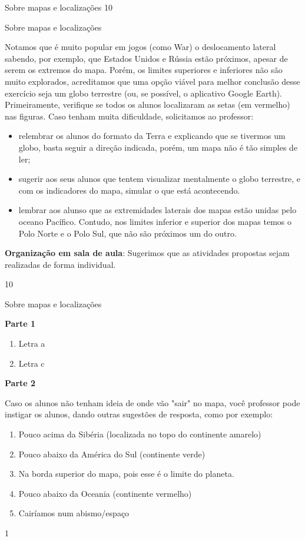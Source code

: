 {\begin{objectives}{Sobre mapas e localizações}
{}{1}{0}
\end{objectives}
\begin{sugestions}{Sobre mapas e localizações}
{
  Notamos que é muito popular em jogos (como War) o deslocamento lateral sabendo, por exemplo, que Estados Unidos e Rússia estão próximos, apesar de serem os extremos do mapa. Porém, os limites superiores e inferiores não são muito explorados, acreditamos que uma opção viável para melhor conclusão desse exercício seja um globo terrestre (ou, se possível, o aplicativo Google Earth).
  Primeiramente, verifique se todos os alunos localizaram as setas (em vermelho) nas figuras.  Caso tenham muita dificuldade, solicitamos ao professor:
  \begin{itemize}
  \item relembrar os alunos do formato da Terra e explicando que se tivermos um globo, basta seguir a direção indicada, porém, um mapa não é tão simples de ler;
  \item sugerir aos seus alunos que tentem visualizar mentalmente o globo terrestre, e com os indicadores do mapa, simular o que está acontecendo.
  \item lembrar aos alunso que as extremidades laterais dos mapas estão unidas pelo oceano Pacífico. Contudo, nos limites inferior e superior dos mapas temos o Polo Norte e o Polo Sul, que não são próximos um do outro.
  \end{itemize}

  \textbf{Organização em sala de aula}: Sugerimos que as atividades propostas sejam realizadas de forma individual.
}{1}{0}
\end{sugestions}
\clearmargin
\begin{answer}{Sobre mapas e localizações}
{
\textbf{Parte 1}
\begin{enumerate}
\item Letra a
\item Letra c
\end{enumerate}

\textbf{Parte 2}

Caso os alunos não tenham ideia de onde vão "sair"{} no mapa, você professor pode instigar os alunos, dando outras sugestões de resposta, como por exemplo:
\begin{enumerate}
\item Pouco acima da Sibéria (localizada no topo do continente amarelo)
\item Pouco abaixo da América do Sul (continente verde)
\item Na borda superior do mapa, pois esse é o limite do planeta.
\item Pouco abaixo da Oceania (continente vermelho)
\item Cairíamos num abismo/espaço
\end{enumerate}
}{1}
\end{answer}

}
